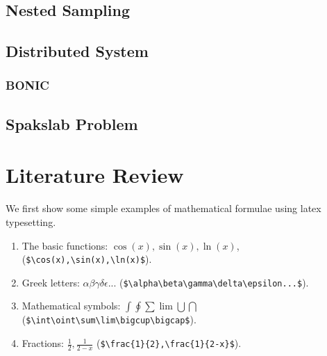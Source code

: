 \documentclass[11pt]{book}
\begin{document}
\section{Nested Sampling} 
\section{Distributed System}
\subsection{BONIC}
\section{Spakslab Problem}

\chapter{Literature Review}

We first show  some simple examples of 
mathematical formulae using latex typesetting.

\begin{enumerate}
\item The basic functions: $\cos(x),  \sin(x),   \ln(x) $,  (\verb+$\cos(x),\sin(x),\ln(x)$+). 
\item Greek letters: $\alpha \beta \gamma \delta\epsilon...$ (\verb+$\alpha\beta\gamma\delta\epsilon...$+).
\item Mathematical symbols: $\int  \oint \sum\lim\bigcup \bigcap$
 (\verb+$\int\oint\sum\lim\bigcup\bigcap$+).
\item Fractions: $\frac{1}{2},\frac{1}{2-x}$ (\verb+$\frac{1}{2},\frac{1}{2-x}$+).
\end{enumerate}
\end{document}
